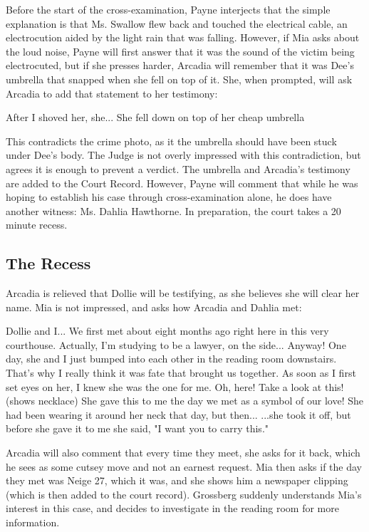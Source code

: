 Before the start of the cross-examination, Payne interjects that the simple explanation is that Ms. Swallow flew back and touched the electrical cable, an electrocution aided by the light rain that was falling. However, if Mia asks about the loud noise, Payne will first answer that it was the sound of the victim being electrocuted, but if she presses harder, Arcadia will remember that it was Dee's umbrella that snapped when she fell on top of it. She, when prompted, will ask Arcadia to add that statement to her testimony:
\begin{center}
After I shoved her, she... She fell down on top of her cheap umbrella
\end{center}
This contradicts the crime photo, as it the umbrella should have been stuck under Dee's body. The Judge is not overly impressed with this contradiction, but agrees it is enough to prevent a verdict. The umbrella and Arcadia's testimony are added to the Court Record. However, Payne will comment that while he was hoping to establish his case through cross-examination alone, he does have another witness: Ms. Dahlia Hawthorne. In preparation, the court takes a 20 minute recess.

\subsection{The Recess}
Arcadia is relieved that Dollie will be testifying, as she believes she will clear her name. Mia is not impressed, and asks how Arcadia and Dahlia met:
\begin{center}
 Dollie and I... We first met about eight months ago right here in this very courthouse. Actually, I'm studying to be a lawyer, on the side... Anyway! One day, she and I just bumped into each other in the reading room downstairs. That's why I really think it was fate that brought us together. As soon as I first set eyes on her, I knew she was the one for me. Oh, here! Take a look at this! (shows necklace) She gave this to me the day we met as a symbol of our love! She had been wearing it around her neck that day, but then... ...she took it off, but before she gave it to me she said, "I want you to carry this."
 \end{center}
 
Arcadia will also comment that every time they meet, she asks for it back, which he sees as some cutsey move and not an earnest request. Mia then asks if the day they met was Neige 27, which it was, and she shows him a newspaper clipping (which is then added to the court record). Grossberg suddenly understands Mia's interest in this case, and decides to investigate in the reading room for more information.


